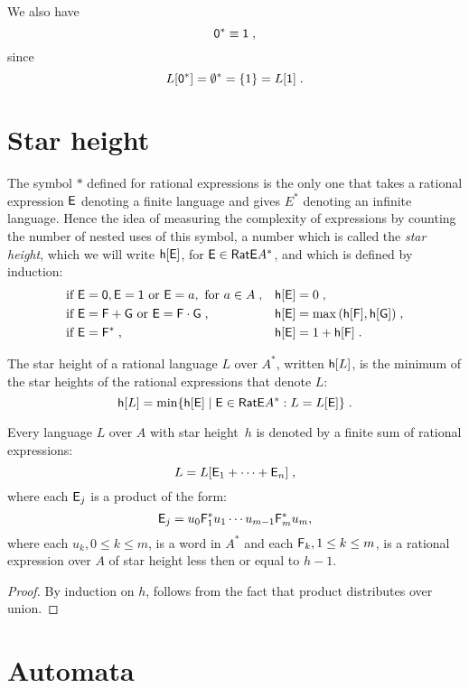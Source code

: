 We also have
\[
    {\mathsf{0}}^* \equiv {\mathsf{1}} \; ,
\]
since
\[
    L[{\mathsf{0}}^*] = \emptyset^* = \{ 1 \} = L[{\mathsf{1}}] \; .
\]

\section{Star height}

The symbol $*$ defined for rational expressions is the only one that takes a rational expression ${\mathsf{E}}$ denoting a finite language and gives $E^*$ denoting an infinite language. Hence the idea of measuring the complexity of expressions by counting the number of nested uses of this symbol, a number which is called the \emph{star height}, which we will write ${\mathsf{h}[{\mathsf{E}}]}$, for ${\mathsf{E}} \in {\mathsf{RatE}} A^*$, and which is defined by induction:
\begin{align*}
    &\text{if } {\mathsf{E}} = {\mathsf{0}}, {\mathsf{E}} = {\mathsf{1}} \text{ or } {\mathsf{E}} = a, \text{ for } a \in A \; , & &{\mathsf{h}[{\mathsf{E}}]} = 0 \; , \\
    &\text{if } {\mathsf{E}} = {\mathsf{F}} + {\mathsf{G}} \text{ or } {\mathsf{E}} = {\mathsf{F}} \cdot {\mathsf{G}}\; , & &{\mathsf{h}[{\mathsf{E}}]} = \max{({\mathsf{h}[{\mathsf{F}}]}, {\mathsf{h}[{\mathsf{G}}]})} \; , \\
    &\text{if } {\mathsf{E}} = {\mathsf{F}}^* \; , & &{\mathsf{h}[{\mathsf{E}}]} = 1 + {\mathsf{h}[{\mathsf{F}}]} \; .
\end{align*}

The star height of a rational language $L$ over $A^*$, written ${\mathsf{h}[L]}$, is the minimum of the star heights of the rational expressions that denote $L$:
\[
    {\mathsf{h}[L]} = \min \{ {\mathsf{h}[{\mathsf{E}}]} \mid {\mathsf{E}} \in {\mathsf{RatE}} A^*: L = L[{\mathsf{E}}] \} \; .
\]

\begin{lemma}\label{lm:star_height_distributivity}
    Every language $L$ over $A$ with star height~$h$ is denoted by a finite sum of rational expressions:
    \[
        L = L[ {\mathsf{E}}_1 + \dotsb + {\mathsf{E}}_n ] \; ,
    \]
    where each ${\mathsf{E}}_j$ is a product of the form:
    \[
        {\mathsf{E}}_j = u_0{\mathsf{F}}_1^*u_1 \dotsm u_{m-1}{\mathsf{F}}_m^*u_m,
    \]
    where each $u_k, 0 \leq k \leq m$, is a word in $A^*$ and each ${\mathsf{F}}_k, 1 \leq k \leq m$, is a rational expression over $A$ of star height less then or equal to $h-1$.
\end{lemma}

\begin{proof}
    By induction on $h$, follows from the fact that product distributes over union.
\end{proof}

\section{Automata}

